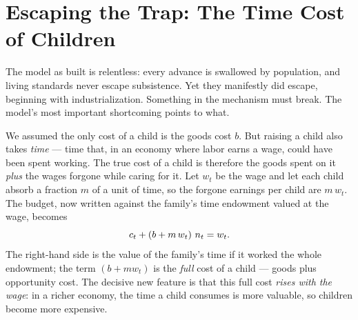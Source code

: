 
\section{Escaping the Trap: The Time Cost of Children}

The model as built is relentless: every advance is swallowed by population, and living standards never escape subsistence. Yet they manifestly did escape, beginning with industrialization. Something in the mechanism must break. The model's most important shortcoming points to what.

We assumed the only cost of a child is the goods cost $b$. But raising a child also takes \emph{time} --- time that, in an economy where labor earns a wage, could have been spent working. The true cost of a child is therefore the goods spent on it \emph{plus} the wages forgone while caring for it. Let $w_t$ be the wage and let each child absorb a fraction $m$ of a unit of time, so the forgone earnings per child are $m\,w_t$. The budget, now written against the family's time endowment valued at the wage, becomes
\begin{equation}
c_t + \left(b + m\, w_t\right)\, n_t = w_t.
\label{eq:malthus-time-budget}
\end{equation}
The right-hand side is the value of the family's time if it worked the whole endowment; the term $(b + m w_t)$ is the \emph{full} cost of a child --- goods plus opportunity cost. The decisive new feature is that this full cost \emph{rises with the wage}: in a richer economy, the time a child consumes is more valuable, so children become more expensive.

